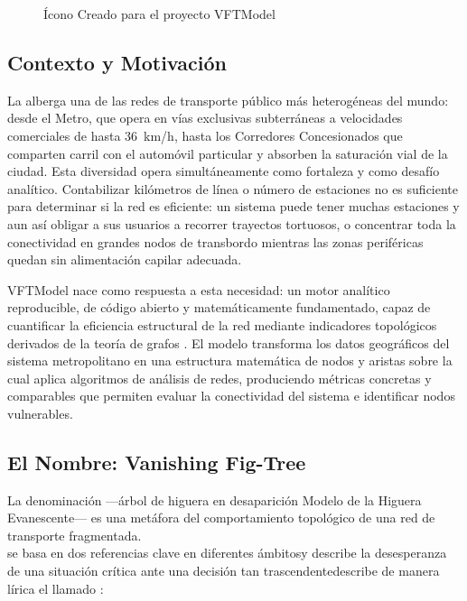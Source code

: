 \begin{figure}[htbp]
  \centering
  \caption[Ícono Personal de VFTModel]{Ícono Creado para el proyecto VFTModel}
  \label{fig:VFTModel-icon}
\end{figure}


\subsection{Contexto y Motivación}
\label{subsec:vft-contexto}

La \zmvm{} alberga una de las redes de transporte público más heterogéneas del
mundo: desde el Metro, que opera en vías exclusivas subterráneas a velocidades
comerciales de hasta 36~km/h, hasta los Corredores Concesionados que comparten
carril con el automóvil particular y absorben la saturación vial de la ciudad.
Esta diversidad opera simultáneamente como fortaleza y como desafío analítico.
Contabilizar kilómetros de línea o número de estaciones no es suficiente para
determinar si la red es eficiente: un sistema puede tener muchas estaciones y
aun así obligar a sus usuarios a recorrer trayectos tortuosos, o concentrar
toda la conectividad en grandes nodos de transbordo mientras las zonas periféricas
quedan sin alimentación capilar adecuada.

VFTModel nace como respuesta a esta necesidad: un motor analítico reproducible,
de código abierto y matemáticamente fundamentado, capaz de cuantificar la
eficiencia estructural de la red mediante indicadores topológicos derivados de
la teoría de grafos \parencite{newman2010networks}. El modelo transforma los
datos geográficos del sistema metropolitano en una estructura matemática de nodos
y aristas sobre la cual aplica algoritmos de análisis de redes, produciendo
métricas concretas y comparables que permiten evaluar la conectividad del sistema
e identificar nodos vulnerables.

\subsection{El Nombre: Vanishing Fig-Tree}
\label{subsec:vft-nombre}

La denominación  —árbol de higuera en desaparición \DIFdelbegin {}\DIFdelend \DIFaddbegin {}\DIFaddend Modelo de la Higuera Evanescente— es una metáfora del comportamiento topológico
de una red de transporte fragmentada.
\\
 se basa en dos referencias clave en diferentes ámbitos\DIFdelbegin {}\DIFdelend \DIFaddbegin {}\DIFaddend y describe la desesperanza de una situación crítica ante una decisión
tan trascendente\DIFdelbegin {}\DIFdelend \DIFaddbegin {}\DIFaddend describe de manera lírica el llamado :

